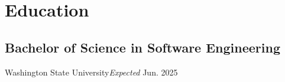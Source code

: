 \section{Education}
\subsection{Bachelor of Science in Software Engineering}{Washington State University}{\textit{Expected} Jun. 2025}

\vspace{0.2em}
